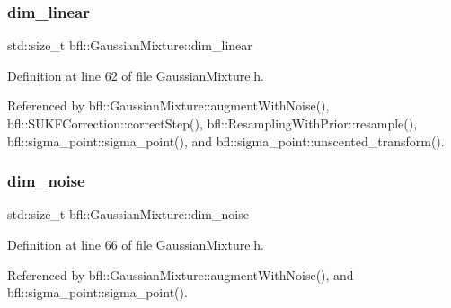 \mbox{\label{classbfl_1_1GaussianMixture_a22a0fbc77f90d9d75e89d7898484c05a}} 
\subsubsection{\texorpdfstring{dim\+\_\+linear}{dim\_linear}}
{\footnotesize\ttfamily std\+::size\+\_\+t bfl\+::\+Gaussian\+Mixture\+::dim\+\_\+linear\hspace{0.3cm}{\ttfamily [inherited]}}



Definition at line 62 of file Gaussian\+Mixture.\+h.



Referenced by bfl\+::\+Gaussian\+Mixture\+::augment\+With\+Noise(), bfl\+::\+S\+U\+K\+F\+Correction\+::correct\+Step(), bfl\+::\+Resampling\+With\+Prior\+::resample(), bfl\+::sigma\+\_\+point\+::sigma\+\_\+point(), and bfl\+::sigma\+\_\+point\+::unscented\+\_\+transform().

\mbox{\label{classbfl_1_1GaussianMixture_adaa8d9c6d03be835769cc848aba81067}} 
\subsubsection{\texorpdfstring{dim\+\_\+noise}{dim\_noise}}
{\footnotesize\ttfamily std\+::size\+\_\+t bfl\+::\+Gaussian\+Mixture\+::dim\+\_\+noise\hspace{0.3cm}{\ttfamily [inherited]}}



Definition at line 66 of file Gaussian\+Mixture.\+h.



Referenced by bfl\+::\+Gaussian\+Mixture\+::augment\+With\+Noise(), and bfl\+::sigma\+\_\+point\+::sigma\+\_\+point().

\mbox{\label{classbfl_1_1GaussianMixture_a12a1175e838a753129f4cc133b2c1a9c}} 
